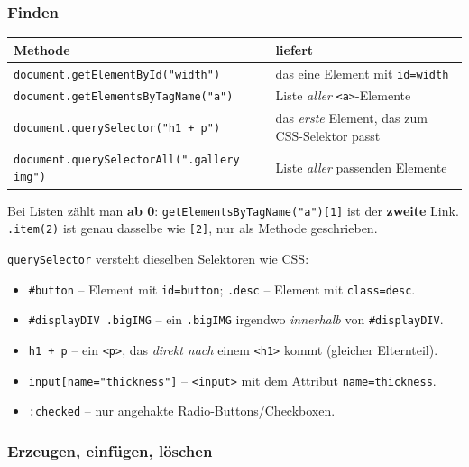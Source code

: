 \documentclass[a4paper,11pt]{article}
\begin{document}
\subsubsection*{Finden}

\begin{center}
\begin{tabular}{@{}lp{6.2cm}@{}}
\toprule
Methode & liefert\\
\midrule
\lstinline|document.getElementById("width")| & das eine Element mit \texttt{id=\textquotedbl{}width\textquotedbl{}}\\
\lstinline|document.getElementsByTagName("a")| & Liste \emph{aller} \texttt{<a>}-Elemente\\
\lstinline|document.querySelector("h1 + p")| & das \emph{erste} Element, das zum CSS-Selektor passt\\
\lstinline|document.querySelectorAll(".gallery img")| & Liste \emph{aller} passenden Elemente\\
\bottomrule
\end{tabular}
\end{center}

Bei Listen zählt man \textbf{ab 0}: \lstinline|getElementsByTagName("a")[1]| ist der \textbf{zweite} Link.
\lstinline|.item(2)| ist genau dasselbe wie \lstinline|[2]|, nur als Methode geschrieben.

\texttt{querySelector} versteht dieselben Selektoren wie CSS:
\begin{itemize}[nosep]
\item \texttt{\#button} -- Element mit \texttt{id=\textquotedbl{}button\textquotedbl{}}; \texttt{.desc} -- Element mit \texttt{class=\textquotedbl{}desc\textquotedbl{}}.
\item \texttt{\#displayDIV .bigIMG} -- ein \texttt{.bigIMG} irgendwo \emph{innerhalb} von \texttt{\#displayDIV}.
\item \texttt{h1 + p} -- ein \texttt{<p>}, das \emph{direkt nach} einem \texttt{<h1>} kommt (gleicher Elternteil).
\item \lstinline|input[name="thickness"]| -- \texttt{<input>} mit dem Attribut \texttt{name=\textquotedbl{}thickness\textquotedbl{}}.
\item \texttt{:checked} -- nur angehakte Radio-Buttons/Checkboxen.
\end{itemize}

\subsubsection*{Erzeugen, einfügen, löschen}
\end{document}
